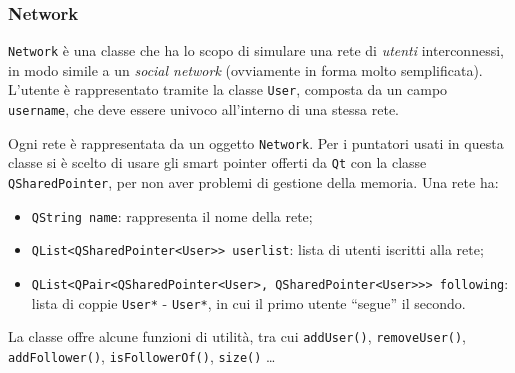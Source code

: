 \subsubsection{Network}
\texttt{Network} è una classe che ha lo scopo di simulare una rete di \emph{utenti} interconnessi, in modo simile
a un \emph{social network} (ovviamente in forma molto semplificata).
L'utente è rappresentato tramite la classe \texttt{User}, composta da un campo \texttt{username}, che deve essere
univoco all'interno di una stessa rete. \par
Ogni rete è rappresentata da un oggetto \texttt{Network}. Per i puntatori usati in questa classe si è scelto
di usare gli smart pointer offerti da \texttt{Qt} con la classe \texttt{QSharedPointer}, per non aver problemi di gestione
della memoria. Una rete ha:
\begin{itemize}
    \item \texttt{QString name}: rappresenta il nome della rete;
    \item \texttt{QList<QSharedPointer<User>> userlist}: lista di utenti iscritti alla rete;
    \item \texttt{QList<QPair<QSharedPointer<User>, QSharedPointer<User>>> following}: lista di coppie
    \texttt{User*} - \texttt{User*}, in cui il primo utente ``segue'' il secondo.
\end{itemize}
La classe offre alcune funzioni di utilità, tra cui \texttt{addUser()}, \texttt{removeUser()}, \texttt{addFollower()}, \texttt{isFollowerOf()}, \texttt{size()} \dots


